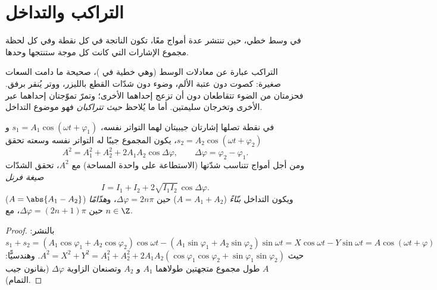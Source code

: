 \section{التراكب والتداخل}

\begin{theorem}[التراكب]\label{thm:b1:wave-propagation:superposition}
في وسط خطي، حين تنتشر عدة أمواج معًا، تكون 
الناتجة في كل نقطة وفي كل لحظة مجموع الإشارات التي كانت كل
موجة ستنتجها وحدها.
\end{theorem}
\admitted

\begin{remark}[الخطية]\label{rem:b1:wave-propagation:linearity}
التراكب عبارة عن معادلات الوسط (وهي خطية
في )، صحيحة ما دامت السعات صغيرة: كصوت دون
عتبة الألم، وضوء دون شدّات القطع بالليزر، ووتر
يُنقر برفق. فحزمتان من الضوء تتقاطعان دون أن تزعج إحداهما الأخرى؛
وتمرّ تموّجتان إحداهما عبر الأخرى وتخرجان سليمتين. أما ما يُلاحظ
\emph{حيث تتراكبان} فهو موضوع التداخل.
\end{remark}

\begin{theorem}\label{thm:b1:wave-propagation:fresnel}
في نقطة تصلها إشارتان جيبيتان لهما التواتر نفسه،
$s_1 = A_1\cos(\omega t + \varphi_1)$ و $s_2 = A_2\cos(\omega t + \varphi_2)$،
يكون المجموع جيبًا له التواتر نفسه وسعته تحقق
\[
A^2 = A_1^2 + A_2^2 + 2A_1A_2\cos\Delta\varphi,
\qquad \Delta\varphi = \varphi_2 - \varphi_1 .
\]
ومن أجل أمواج تتناسب شدّتها (الاستطاعة على واحدة المساحة) مع
$A^2$، تحقق الشدّات \emph{صيغة فرنل}
\[
I = I_1 + I_2 + 2\sqrt{I_1 I_2}\,\cos\Delta\varphi .
\]
ويكون التداخل \emph{بنّاءً} ($A = A_1 + A_2$) حين
$\Delta\varphi = 2n\pi$، و\emph{هدّامًا} ($A = \abs{A_1 - A_2}$)
حين $\Delta\varphi = (2n + 1)\pi$، مع $n \in \Z$.
\end{theorem}

\begin{proof}
بالنشر: $s_1 + s_2 = (A_1\cos\varphi_1 + A_2\cos\varphi_2)\cos\omega t -
(A_1\sin\varphi_1 + A_2\sin\varphi_2)\sin\omega t = X\cos\omega t -
Y\sin\omega t = A\cos(\omega t + \varphi)$ حيث $A^2 = X^2 + Y^2 =
A_1^2 + A_2^2 + 2A_1A_2(\cos\varphi_1\cos\varphi_2 + \sin\varphi_1\sin\varphi_2)$.
وهندسيًّا: $A$ طول مجموع متجهتين طولاهما
$A_1$ و $A_2$ وتصنعان الزاوية $\Delta\varphi$ (بقانون جيب التمام).
\end{proof}

